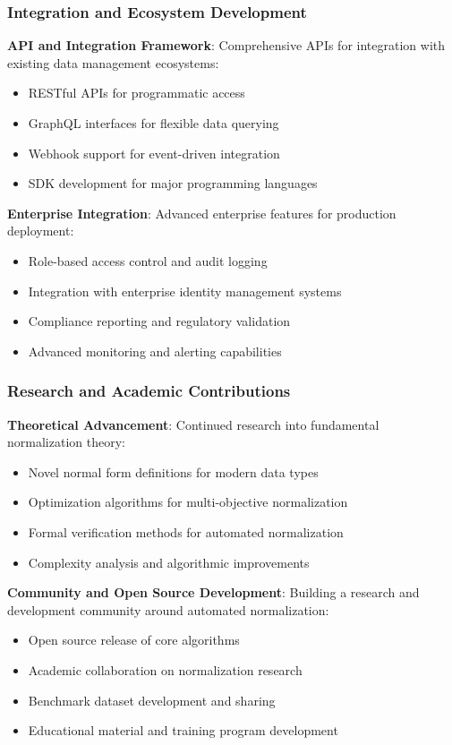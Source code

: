 \documentclass[acmsmall]{acmart}
\begin{document}
\subsubsection{Integration and Ecosystem Development}

\textbf{API and Integration Framework}: Comprehensive APIs for integration with existing data management ecosystems:
\begin{itemize}
\item RESTful APIs for programmatic access
\item GraphQL interfaces for flexible data querying
\item Webhook support for event-driven integration
\item SDK development for major programming languages
\end{itemize}

\textbf{Enterprise Integration}: Advanced enterprise features for production deployment:
\begin{itemize}
\item Role-based access control and audit logging
\item Integration with enterprise identity management systems
\item Compliance reporting and regulatory validation
\item Advanced monitoring and alerting capabilities
\end{itemize}

\subsubsection{Research and Academic Contributions}

\textbf{Theoretical Advancement}: Continued research into fundamental normalization theory:
\begin{itemize}
\item Novel normal form definitions for modern data types
\item Optimization algorithms for multi-objective normalization
\item Formal verification methods for automated normalization
\item Complexity analysis and algorithmic improvements
\end{itemize}

\textbf{Community and Open Source Development}: Building a research and development community around automated normalization:
\begin{itemize}
\item Open source release of core algorithms
\item Academic collaboration on normalization research
\item Benchmark dataset development and sharing
\item Educational material and training program development
\end{itemize}
\end{document}
